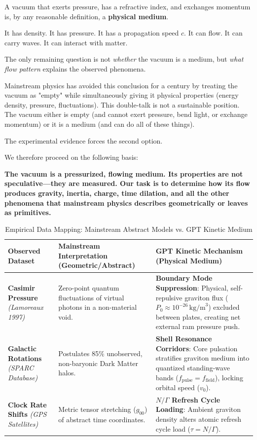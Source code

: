 \documentclass[12pt, a4paper]{article}
\begin{document}
A vacuum that exerts pressure, has a refractive index, and exchanges momentum is, by any reasonable definition, a \textbf{physical medium}.

It has density. It has pressure. It has a propagation speed \(c\). It can flow. It can carry waves. It can interact with matter.

The only remaining question is not \textit{whether} the vacuum is a medium, but \textit{what flow pattern} explains the observed phenomena.

Mainstream physics has avoided this conclusion for a century by treating the vacuum as "empty" while simultaneously giving it physical properties (energy density, pressure, fluctuations). This double-talk is not a sustainable position. The vacuum either is empty (and cannot exert pressure, bend light, or exchange momentum) or it is a medium (and can do all of these things).

The experimental evidence forces the second option.

We therefore proceed on the following basis:

\textbf{The vacuum is a pressurized, flowing medium. Its properties are not speculative—they are measured. Our task is to determine how its flow produces gravity, inertia, charge, time dilation, and all the other phenomena that mainstream physics describes geometrically or leaves as primitives.}
\begin{table}[h!]
\centering
\caption{Empirical Data Mapping: Mainstream Abstract Models vs. GPT Kinetic Medium}
\label{tab:empirical_mapping}
\begin{tabular}{p{} p{} p{}}
\toprule
\textbf{Observed Dataset} & \textbf{Mainstream Interpretation (Geometric/Abstract)} & \textbf{GPT Kinetic Mechanism (Physical Medium)} \\
\midrule
\textbf{Casimir Pressure} \newline \textit{(Lamoreaux 1997)} & Zero-point quantum fluctuations of virtual photons in a non-material void. & \textbf{Boundary Mode Suppression}: Physical, self-repulsive graviton flux ($P_0 \approx 10^{-26}\,\text{kg/m}^3$) excluded between plates, creating net external ram pressure push. \\
\midrule
\textbf{Galactic Rotations} \newline \textit{(SPARC Database)} & Postulates 85\% unobserved, non-baryonic Dark Matter halos. & \textbf{Shell Resonance Corridors}: Core pulsation stratifies graviton medium into quantized standing-wave bands ($f_{\text{pulse}} = f_{\text{field}}$), locking orbital speed ($v_0$). \\
\midrule
\textbf{Clock Rate Shifts} \newline \textit{(GPS Satellites)} & Metric tensor stretching ($g_{00}$) of abstract time coordinates. & \textbf{$N/\Gamma$ Refresh Cycle Loading}: Ambient graviton density alters atomic refresh cycle load ($\tau = N/\Gamma$). \\
\bottomrule
\end{tabular}
\end{table}
\end{document}
